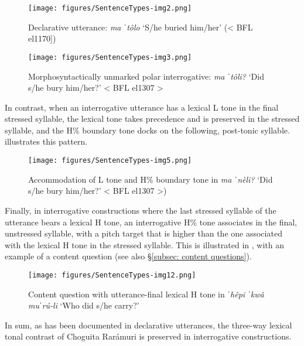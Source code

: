 \begin{figure}
\texttt{[image: figures/SentenceTypes-img2.png]}
\caption{
\label{fig: prosody declarative intonation}
Declarative utterance: \textit{ma ˈtôlo} `S/he buried him/her' (< BFL el1170])}
\end{figure}


\begin{figure}
\texttt{[image: figures/SentenceTypes-img3.png]}
\caption{
\label{fig: prosody morphosyntactically unmarked polar intonation}
Morphosyntactically unmarked polar interrogative: \textit{ma ˈtôli?} `Did s/he bury him/her?' < BFL el1307 >}
\end{figure}

In contrast, when an interrogative utterance has a lexical L tone in the final stressed syllable, the lexical tone takes precedence and is preserved in the stressed syllable, and the H\% boundary tone docks on the following, post-tonic syllable.  illustrates this pattern.


\begin{figure}
\texttt{[image: figures/SentenceTypes-img5.png]}
\caption{
\label{fig: prosody L tone plus H boundary tone}
Accommodation of L tone and H\% boundary tone in \textit{ma ˈnèli?} `Did s/he bury him/her?' < BFL el1307 >)}
\end{figure}

Finally, in interrogative constructions where the last stressed syllable of the utterance bears a lexical H tone, an interrogative H\% tone associates in the final, unstressed syllable, with a pitch target that is higher than the one associated with the lexical H tone in the stressed syllable. This is illustrated in , with an example of a content question (see also §\ref{subsec: content questions}).

\begin{figure}
\texttt{[image: figures/SentenceTypes-img12.png]}
\caption{
\label{fig: prosody content question lexical H tone}
Content question with utterance-final lexical H tone in \textit{ˈhêpi ˈkwâ muˈrú-li} `Who did s/he carry?'}
\end{figure}

\largerpage
In sum, as has been documented in declarative utterances, the three-way lexical tonal contrast of Choguita Rarámuri is preserved in interrogative constructions.

